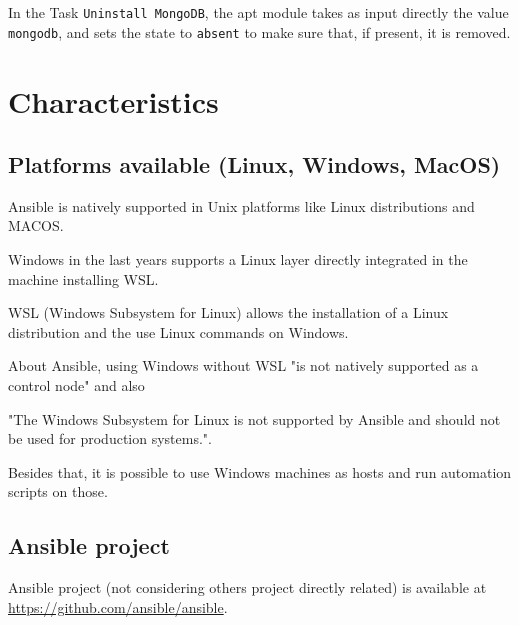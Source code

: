 \documentclass[12pt,a4paper,openright,twoside]{book}
\begin{document}
In the Task \texttt{Uninstall MongoDB}, the apt module takes as input directly the value \texttt{mongodb}, and sets the state to \texttt{absent} to make sure that, if present, it is removed.




\section{Characteristics}

\subsection{Platforms available (Linux, Windows, MacOS)}
Ansible is natively supported in Unix platforms like Linux distributions and MACOS.


Windows in the last years supports a Linux layer directly integrated in the machine installing WSL.

WSL (Windows Subsystem for Linux) allows the installation of a Linux distribution and the use Linux commands on Windows.


About Ansible, using Windows without WSL "is not natively supported as a control node"\cite{ansibleDocInstallIntro} and also


"The Windows Subsystem for Linux is not supported by Ansible and should not be used for production systems."\cite{ansibleWinFaq}.


Besides that, it is possible to use Windows machines as hosts and run automation scripts on those.

\subsection{Ansible project}

Ansible project (not considering others project directly related) is available at \url{https://github.com/ansible/ansible}\cite{ansibleGithub}.
\end{document}

